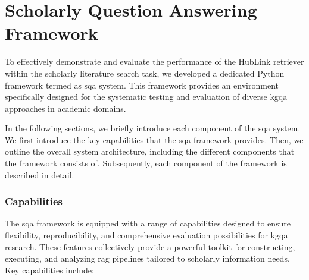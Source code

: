 \section{Scholarly Question Answering Framework}
\label{sec:implementation_sqa_framework}

To effectively demonstrate and evaluate the performance of the HubLink retriever within the scholarly literature search task, we developed a dedicated Python framework termed as \acrfull{sqa} system. This framework provides an environment specifically designed for the systematic testing and evaluation of diverse \gls{kgqa} approaches in academic domains. 

In the following sections, we briefly introduce each component of the \gls{sqa} system. We first introduce the key capabilities that the \gls{sqa} framework provides. Then, we outline the overall system architecture, including the different components that the framework consists of. Subsequently, each component of the framework is described in detail.

\subsubsection{Capabilities}
The \gls{sqa} framework is equipped with a range of capabilities designed to ensure flexibility, reproducibility, and comprehensive evaluation possibilities for \gls{kgqa} research. These features collectively provide a powerful toolkit for constructing, executing, and analyzing \gls{rag} pipelines tailored to scholarly information needs. Key capabilities include:

